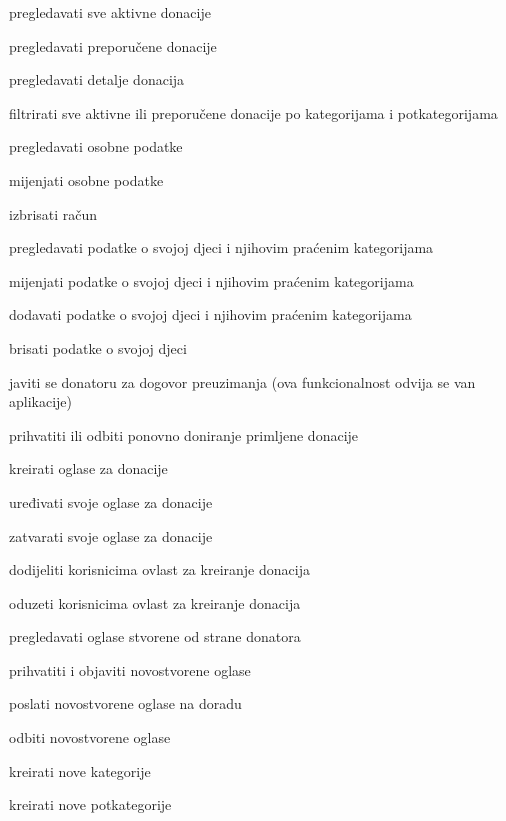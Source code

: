 \begin{packed_enum}
\begin{packed_enum}
				\end{packed_enum}

				\item  {}
				
				\begin{packed_enum}
					
					\item pregledavati sve aktivne donacije
					\item pregledavati preporučene donacije
					\item pregledavati detalje donacija
					\item filtrirati sve aktivne ili preporučene donacije po kategorijama i potkategorijama
					\item pregledavati osobne podatke
					\item mijenjati osobne podatke
					\item izbrisati račun
					\item pregledavati podatke o svojoj djeci i njihovim praćenim kategorijama
					\item mijenjati podatke o svojoj djeci i njihovim praćenim kategorijama
					\item dodavati podatke o svojoj djeci i njihovim praćenim kategorijama
					\item brisati podatke o svojoj djeci
					\item javiti se donatoru za dogovor preuzimanja (ova funkcionalnost odvija se van aplikacije)
					\item prihvatiti ili odbiti ponovno doniranje primljene donacije
					\item kreirati oglase za donacije
					\item uređivati svoje oglase za donacije 
					\item zatvarati svoje oglase za donacije
					
				\end{packed_enum}

				\item  {}
				
				\begin{packed_enum}
					
					\item dodijeliti korisnicima ovlast za kreiranje donacija
					\item oduzeti korisnicima ovlast za kreiranje donacija
					\item pregledavati oglase stvorene od strane donatora
					\item prihvatiti i objaviti novostvorene oglase
					\item poslati novostvorene oglase na doradu
					\item odbiti novostvorene oglase
					\item kreirati nove kategorije
					\item kreirati nove potkategorije
					

\end{packed_enum}
\end{packed_enum}
